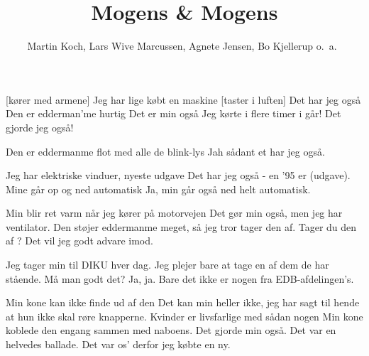 \documentclass[10pt]{article}
\title{Mogens \& Mogens}
\author{Martin Koch, Lars Wive Marcussen, Agnete Jensen, Bo Kjellerup o.\ a.\ }
\begin{document}
\begin{sketch}
[kører med armene]     Jeg har lige købt en ma\-skine
[taster i luften]     Det har jeg også        
     Den er edderman'me hurtig
     Det er min også
     Jeg kørte i flere timer i går!
     Det gjorde jeg også!

     Den er eddermanme flot med alle de blink-lys
     Jah sådant et har jeg også.

     Jeg har elektriske vinduer, nyeste udgave
     Det har jeg også - en '95 er (udgave).
     Mine går op og ned automatisk
     Ja, min går også ned helt automatisk.



      Min blir ret varm når jeg kører på motorvejen
     Det gør min også, men jeg har ventilator. Den støjer
        eddermanme meget, så jeg tror tager den af.
     Tager du den af ? Det vil jeg godt advare imod.


     Jeg tager min til DIKU hver dag.
     Jeg plejer bare at tage en af dem de har stående.
     Må man godt det?
     Ja, ja. Bare det ikke er nogen fra EDB-afdelingen's.

     Min kone kan ikke finde ud af den
     Det kan min heller ikke, jeg har sagt til hende at hun
        ikke skal røre knapperne.
     Kvinder er livsfarlige med sådan nogen
     Min kone koblede den engang sammen med naboens.
     Det gjorde min også. Det var en helvedes ballade. Det
        var os' derfor jeg købte en ny.


\end{sketch}
\end{document}
